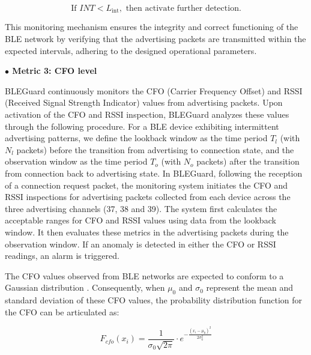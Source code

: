 \vspace{-4pt}

\begin{equation}
\text{If } INT < L_{\text{int}}, \text{ then activate further detection.}
\end{equation}

This monitoring mechanism ensures the integrity and correct functioning of the BLE network by verifying that the advertising packets are transmitted within the expected intervals, adhering to the designed operational parameters.

\vspace{6pt}

\noindent \textbf{$\bullet$ Metric 3: CFO level}

\noindent BLEGuard continuously monitors the CFO (Carrier Frequency Offset) and RSSI (Received Signal Strength Indicator) values from advertising packets. Upon activation of the CFO and RSSI inspection, BLEGuard analyzes these values through the following procedure. For a BLE device exhibiting intermittent advertising patterns, we define the lookback window as the time period $T_l$ (with $N_l$ packets) before the transition from advertising to connection state, and the observation window as the time period $T_o$ (with $N_o$ packets) after the transition from connection back to advertising state. In BLEGuard, following the reception of a connection request packet, the monitoring system initiates the CFO and RSSI inspections for advertising packets collected from each device across the three advertising channels (37, 38 and 39). The system first calculates the acceptable ranges for CFO and RSSI values using data from the lookback window. It then evaluates these metrics in the advertising packets during the observation window. If an anomaly is detected in either the CFO or RSSI readings, an alarm is triggered.

\vspace{6pt}

The CFO values observed from BLE networks are expected to conform to a Gaussian distribution \cite{wu2020blueshield}. Consequently, when $ \mu_{0} $ and $ \sigma_{0} $ represent the mean and standard deviation of these CFO values, the probability distribution function for the CFO can be articulated as:

\vspace{-4pt}

\begin{equation}
F_{cfo}(x_i) = \frac{1}{\sigma_{0} \sqrt{2\pi}} \cdot e^{-\frac{\left(x_i-\mu_0\right)^2}{2 \sigma_0^2}}
\end{equation}

